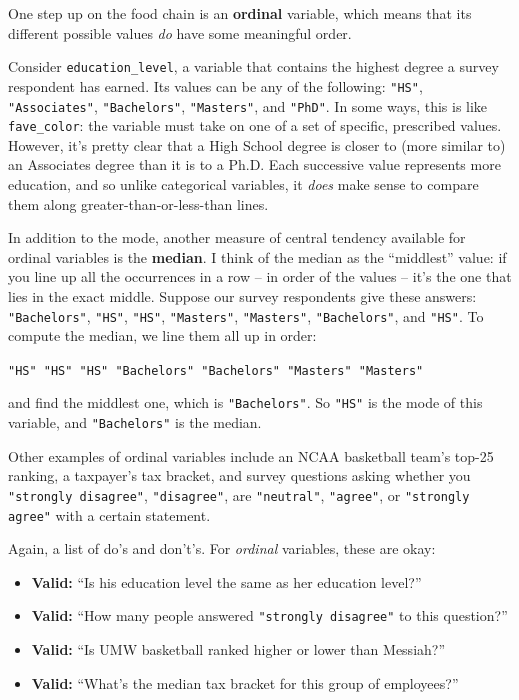 One step up on the food chain is an \textbf{ordinal} variable, which means that
its different possible values \textit{do} have some meaningful order.

Consider \texttt{education\_level}, a variable that contains the highest degree
a survey respondent has earned. Its values can be any of the following:
\texttt{"HS"}, \texttt{"Associates"}, \texttt{"Bachelors"}, \texttt{"Masters"},
and \texttt{"PhD"}. In some ways, this is like \texttt{fave\_color}: the
variable must take on one of a set of specific, prescribed values. However,
it's pretty clear that a High School degree is closer to (more similar to) an
Associates degree than it is to a Ph.D. Each successive value represents more
education, and so unlike categorical variables, it \textit{does} make sense to
compare them along greater-than-or-less-than lines.


\medskip
In addition to the mode, another measure of central tendency available for
ordinal variables is the \textbf{median}. I think of the median as the
``middlest'' value: if you line up all the occurrences in a row -- in order of
the values -- it's the one that lies in the exact middle. Suppose our survey
respondents give these answers: \texttt{"Bachelors"}, \texttt{"HS"},
\texttt{"HS"}, \texttt{"Masters"}, \texttt{"Masters"}, \texttt{"Bachelors"},
and \texttt{"HS"}. To compute the median, we line them all up in order:

\vspace{-.15in}
\begin{center}
\small
\texttt{"HS"  "HS"  "HS"  "Bachelors"  "Bachelors"  "Masters"  "Masters"}
\end{center}
\vspace{-.15in}

and find the middlest one, which is \texttt{"Bachelors"}. So \texttt{"HS"} is
the mode of this variable, and \texttt{"Bachelors"} is the median.

\medskip
Other examples of ordinal variables include an NCAA basketball team's top-25
ranking, a taxpayer's tax bracket, and survey questions asking whether you
\texttt{"strongly disagree"}, \texttt{"disagree"}, are \texttt{"neutral"},
\texttt{"agree"}, or \texttt{"strongly agree"} with a certain statement.

\medskip
Again, a list of do's and don't's. For \textit{ordinal} variables, these are
okay:

\begin{itemize}[nosep]
\item \textbf{Valid:} ``Is his education level the same as her education level?''
\item \textbf{Valid:} ``How many people answered \texttt{"strongly disagree"} to
this question?''
\item \textbf{Valid:} ``Is UMW basketball ranked higher or lower than Messiah?''
\item \textbf{Valid:} ``What's the median tax bracket for this group of
employees?''
\end{itemize}


